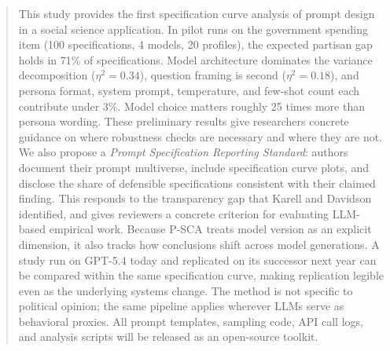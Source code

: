 \documentclass[10pt]{article}
\begin{document}
\begin{abstract}
This study provides the first specification curve analysis of prompt design in a social science application. In pilot runs on the government spending item (100 specifications, 4 models, 20 profiles), the expected partisan gap holds in 71\% of specifications. Model architecture dominates the variance decomposition ($\eta^2 = 0.34$), question framing is second ($\eta^2 = 0.18$), and persona format, system prompt, temperature, and few-shot count each contribute under 3\%. Model choice matters roughly 25 times more than persona wording. These preliminary results give researchers concrete guidance on where robustness checks are necessary and where they are not. We also propose a \textit{Prompt Specification Reporting Standard}: authors document their prompt multiverse, include specification curve plots, and disclose the share of defensible specifications consistent with their claimed finding. This responds to the transparency gap that Karell and Davidson \cite{karell2025integrating} identified, and gives reviewers a concrete criterion for evaluating LLM-based empirical work. Because P-SCA treats model version as an explicit dimension, it also tracks how conclusions shift across model generations. A study run on GPT-5.4 today and replicated on its successor next year can be compared within the same specification curve, making replication legible even as the underlying systems change. The method is not specific to political opinion; the same pipeline applies wherever LLMs serve as behavioral proxies. All prompt templates, sampling code, API call logs, and analysis scripts will be released as an open-source toolkit.
\end{abstract}
\end{document}
